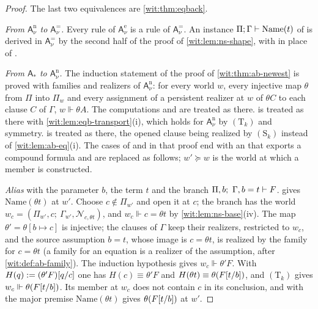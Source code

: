 \begin{proof}
The last two equivalences are \cref{wit:thm:eqback}.

\emph{From $\mathsf{A}^{\mathrm n}_{\nu}$ to $\mathsf{A}^{=}_{\nu}$.}  Every
rule of $\mathsf{A}^{\mathrm e}_{\nu}$ is a rule of $\mathsf{A}^{=}_{\nu}$.
An instance $\Pi;\Gamma\vdash\mathrm{Name}(t)$ of  is
derived in $\mathsf{A}^{=}_{\nu}$ by the second half of the proof of
\cref{wit:lem:ns-shape}, with  in place of
.

\emph{From $\mathsf{A}_{\ast}$ to $\mathsf{A}^{\mathrm n}_{\nu}$.}  The
induction statement of the proof of \cref{wit:thm:ab-newest} is proved with
families and realizers of $\mathsf{A}^{\mathrm n}_{\nu}$: for every world
$w$, every injective map $\theta$ from $\Pi$ into $\Pi_w$ and every
assignment of a persistent realizer at $w$ of $\theta C$ to each clause $C$
of $\Gamma$, $w\Vdash\theta A$.  The computations and  are
treated as there.   is treated as there with
\cref{wit:lem:eqb-transport}(i), which holds for
$\mathsf{A}^{\mathrm n}_{\nu}$ by $(\mathrm T_k)$ and symmetry.
 is treated as there, the opened clause being realized by
$(\mathrm S_k)$ instead of \cref{wit:lem:ab-eq}(i).  The cases of
 and  in that proof end with an
 that exports a compound formula and are replaced as
follows; $w'\succeq w$ is the world at which a member is constructed.

\emph{Alias} with the parameter $b$, the term $t$ and the branch
$\Pi,b;\ \Gamma,b=t\vdash F$.   gives
$\mathrm{Name}(\theta t)$ at $w'$.  Choose $c\notin\Pi_{w'}$ and open it at
$c$; the branch has the world
$w_c=(\Pi_{w'},c;\ \Gamma_{w'},\mathcal N_{c,\theta t})$, and
$w_c\Vdash c=\theta t$ by \cref{wit:lem:ns-base}(iv).  The map
$\theta'=\theta[b\mapsto c]$ is injective; the clauses of $\Gamma$ keep their
realizers, restricted to $w_c$, and the source assumption $b=t$, whose image
is $c=\theta t$, is realized by the family for $c=\theta t$ (a family for an
equation is a realizer of the assumption, after \cref{wit:def:ab-family}).
The induction hypothesis gives $w_c\Vdash\theta'F$.  With
$H(q)\mathrel{:=}(\theta'F)[q/c]$ one has $H(c)\equiv\theta'F$ and
$H(\theta t)\equiv\theta(F[t/b])$, and $(\mathrm T_k)$ gives
$w_c\Vdash\theta(F[t/b])$.  Its member at $w_c$ does not contain $c$
in its conclusion, and  with the major premise
$\mathrm{Name}(\theta t)$ gives $\theta(F[t/b])$ at $w'$.


\end{proof}
